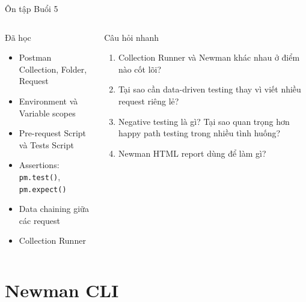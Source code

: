 \documentclass[aspectratio=169,10pt]{beamer}
\begin{document}
\begin{frame}{Ôn tập Buổi 5}
  \begin{columns}
    \begin{block}{Đã học}
      \begin{itemize}
        \item Postman Collection, Folder, Request
        \item Environment và Variable scopes
        \item Pre-request Script và Tests Script
        \item Assertions: \texttt{pm.test()}, \texttt{pm.expect()}
        \item Data chaining giữa các request
        \item Collection Runner
      \end{itemize}
    \end{block}

    \begin{exampleblock}{Câu hỏi nhanh}
      \small
      \begin{enumerate}
        \item Collection Runner và Newman khác nhau ở điểm nào cốt lõi?
        \item Tại sao cần data-driven testing thay vì viết
          nhiều request riêng lẻ?
        \item Negative testing là gì? Tại sao quan trọng hơn
          happy path testing trong nhiều tình huống?
        \item Newman HTML report dùng để làm gì?
      \end{enumerate}
    \end{exampleblock}
  \end{columns}
\end{frame}

\section{Newman CLI}
\end{document}
